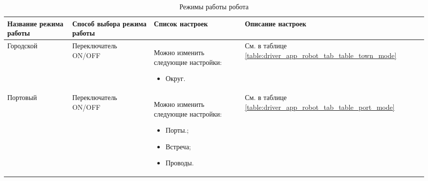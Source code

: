       \begin{table}
          \begin{center}
          \caption {Режимы работы робота}
          \label{driver_app_robot_tab_modes}
          \setlength{\extrarowheight}{2mm}
          \begin{tabular}{|p{3cm}|p{3cm}|p{6cm}|p{3cm}|}

            \hline     \textbf{Название режима работы}&\textbf{Способ выбора режима работы}&\textbf{Список настроек}&\textbf{Описание настроек} \\ [2mm]

            \hline   Городской & Переключатель ON/OFF & Можно изменить следующие настройки: \begin{itemize} \item Округ. \end{itemize} & См. в таблице \ref{table:driver_app_robot_tab_table_town_mode} \\ [2mm]

            \hline   Портовый & Переключатель ON/OFF & Можно изменить следующие настройки: \begin{itemize} \item Порты.;  \item Встреча;  \item Проводы. \end{itemize} & См. в таблице \ref{table:driver_app_robot_tab_table_port_mode}  \\ [2mm]

            \hline
          \end{tabular}
          \end{center}
      \end{table}

